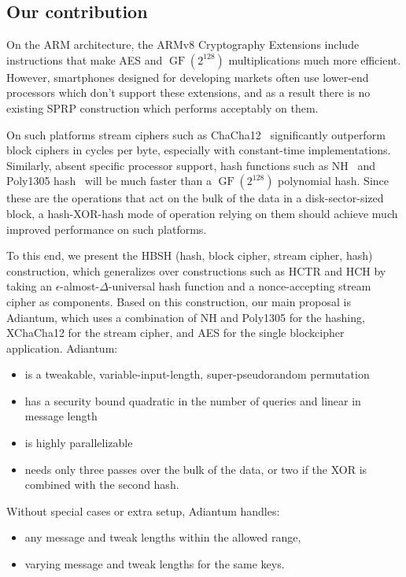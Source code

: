 \documentclass[journal=tosc,preprint,floatrow,submission]{iacrtrans}
\DeclareMathOperator{\GF}{GF}
\begin{document}
\subsection{Our contribution}
On the ARM architecture, the ARMv8 Cryptography Extensions include instructions that make
AES and $\GF(2^{128})$ multiplications much more efficient. However,
smartphones designed for developing markets
often use lower-end processors which
don't support these extensions, and as a result there is no existing SPRP construction which performs
acceptably on them.

On such platforms stream ciphers such as ChaCha12~\cite{chacha} significantly
outperform block ciphers in cycles per byte, especially with constant-time implementations.
Similarly, absent specific processor support, hash functions such as NH~\cite{nh} and
Poly1305 hash~\cite{poly1305} will be much faster
than a $\GF(2^{128})$ polynomial hash. Since these are the operations that act on the bulk of
the data in a disk-sector-sized block, a hash-XOR-hash
mode of operation relying on them should achieve
much improved performance on such platforms.

To this end, we present the HBSH (hash, block cipher, stream cipher, hash)
construction, which generalizes over constructions such as
HCTR and HCH by taking an $\epsilon$-almost-$\Delta$-universal hash function and a
nonce-accepting stream cipher
as components. Based on this construction, our main proposal is Adiantum,
which uses a combination of NH and Poly1305 for the hashing, XChaCha12 for the stream cipher, and
AES for the single blockcipher application. Adiantum:
\begin{itemize}
    \item is a tweakable, variable-input-length, super-pseudorandom permutation
    \item has a security bound quadratic in the number of queries and linear in message length
    \item is highly parallelizable
    \item needs only three passes over the bulk of the data, or
        two if the XOR is combined with the second hash.
\end{itemize}

Without special cases or extra setup, Adiantum handles:
\begin{itemize}
    \item any message and tweak lengths within the allowed range,
    \item varying message and tweak lengths for the same keys.
\end{itemize}
\end{document}
